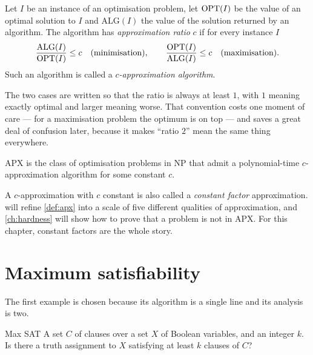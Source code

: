 \begin{definition}\label{def:approx-ratio}
Let $I$ be an instance of an optimisation problem, let $\mathrm{OPT}(I)$ be the value
of an optimal solution to $I$ and $\mathrm{ALG}(I)$ the value of the solution
returned by an algorithm. The algorithm has \emph{approximation ratio} $c$ if
for every instance $I$
\[
  \frac{\mathrm{ALG}(I)}{\mathrm{OPT}(I)} \le c \quad\text{(minimisation)},
  \qquad
  \frac{\mathrm{OPT}(I)}{\mathrm{ALG}(I)} \le c \quad\text{(maximisation)}.
\]
Such an algorithm is called a \emph{$c$-approximation algorithm}.
\end{definition}

The two cases are written so that the ratio is always at least $1$, with $1$
meaning exactly optimal and larger meaning worse. That convention costs one
moment of care --- for a maximisation problem the optimum is on top --- and
saves a great deal of confusion later, because it makes ``ratio $2$'' mean the
same thing everywhere.

\begin{definition}[APX]\label{def:apx}
\textrm{APX} is the class of optimisation problems in \textrm{NP} that admit a
polynomial-time $c$-approximation algorithm for some constant $c$.
\end{definition}

A $c$-approximation with $c$ constant is also called a \emph{constant factor}
approximation.  will refine \cref{def:apx} into a scale of
five different qualities of approximation, and \cref{ch:hardness} will show how
to prove that a problem is not in \textrm{APX}. For this chapter, constant
factors are the whole story.

\section{Maximum satisfiability}
\label{sec:max-sat}

The first example is chosen because its algorithm is a single line and its
analysis is two.

\begin{probdef}{Max SAT}
  \instance A set $C$ of clauses over a set $X$ of Boolean variables, and an
  integer $k$.
  \question Is there a truth assignment to $X$ satisfying at least $k$ clauses
  of $C$?
\end{probdef}

